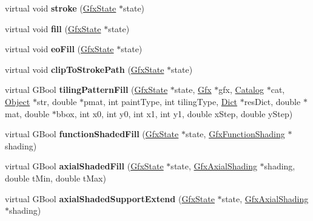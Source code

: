 \begin{DoxyCompactItemize}
virtual void {\bfseries stroke} (\hyperlink{class_gfx_state}{Gfx\+State} $\ast$state)
\item 
\mbox{\label{class_cairo_output_dev_ac72d97e45c2a7bebe659e5aa32b25e34}} 
virtual void {\bfseries fill} (\hyperlink{class_gfx_state}{Gfx\+State} $\ast$state)
\item 
\mbox{\label{class_cairo_output_dev_af0be5a8478239af833a8c2f84ec40ebb}} 
virtual void {\bfseries eo\+Fill} (\hyperlink{class_gfx_state}{Gfx\+State} $\ast$state)
\item 
\mbox{\label{class_cairo_output_dev_af8f3e365b2a760689a52bb63f514cd12}} 
virtual void {\bfseries clip\+To\+Stroke\+Path} (\hyperlink{class_gfx_state}{Gfx\+State} $\ast$state)
\item 
\mbox{\label{class_cairo_output_dev_adfda1f87b2254f572669b0ba0d4c779e}} 
virtual G\+Bool {\bfseries tiling\+Pattern\+Fill} (\hyperlink{class_gfx_state}{Gfx\+State} $\ast$state, \hyperlink{class_gfx}{Gfx} $\ast$gfx, \hyperlink{class_catalog}{Catalog} $\ast$cat, \hyperlink{class_object}{Object} $\ast$str, double $\ast$pmat, int paint\+Type, int tiling\+Type, \hyperlink{class_dict}{Dict} $\ast$res\+Dict, double $\ast$mat, double $\ast$bbox, int x0, int y0, int x1, int y1, double x\+Step, double y\+Step)
\item 
\mbox{\label{class_cairo_output_dev_a3de3a6e92ba700bc913511b9e7238fe8}} 
virtual G\+Bool {\bfseries function\+Shaded\+Fill} (\hyperlink{class_gfx_state}{Gfx\+State} $\ast$state, \hyperlink{class_gfx_function_shading}{Gfx\+Function\+Shading} $\ast$shading)
\item 
\mbox{\label{class_cairo_output_dev_a36cbab934324a46ed5a80b1a61a20da1}} 
virtual G\+Bool {\bfseries axial\+Shaded\+Fill} (\hyperlink{class_gfx_state}{Gfx\+State} $\ast$state, \hyperlink{class_gfx_axial_shading}{Gfx\+Axial\+Shading} $\ast$shading, double t\+Min, double t\+Max)
\item 
\mbox{\label{class_cairo_output_dev_a3614ebf2e905a372ef2c7ef545103f8d}} 
virtual G\+Bool {\bfseries axial\+Shaded\+Support\+Extend} (\hyperlink{class_gfx_state}{Gfx\+State} $\ast$state, \hyperlink{class_gfx_axial_shading}{Gfx\+Axial\+Shading} $\ast$shading)

\end{DoxyCompactItemize}

